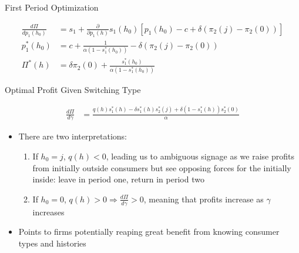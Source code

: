 \documentclass[aspectratio=169,professionalfonts]{beamer}
\begin{document}
\begin{frame}{First Period Optimization}
  \begin{tcolorbox}
    [
    boxsep=0pt,
    left=2pt, right=2pt,
    top=1pt, bottom=1pt,
    before skip=2pt, after skip=2pt
    ]
    \setlength{\abovedisplayskip}{2pt}
    \setlength{\belowdisplayskip}{2pt}
    \begin{align*}
      \frac{d\Pi}{d p_1(h_0)} &= s_1 + \frac{\partial}{\partial p_1(h)}s_1(h_0)[p_1(h_0) - c + \delta(\pi_2(j) - \pi_2(0))] \\
      p_1^*(h_0) &= c + \frac{1}{\alpha(1-s_1^*(h_0))} - \delta(\pi_2(j) - \pi_2(0)) \\
      \Pi^*(h) &= \delta\pi_2(0) + \frac{s_1^*(h_0)}{\alpha(1-s_1^*(h_0))}
    \end{align*}
  \end{tcolorbox}
\end{frame}

\begin{frame}{Optimal Profit Given Switching Type}
  \begin{tcolorbox}
    [
    boxsep=0pt,
    left=2pt, right=2pt,
    top=1pt, bottom=1pt,
    before skip=2pt, after skip=2pt
    ]
    \setlength{\abovedisplayskip}{2pt}
    \setlength{\belowdisplayskip}{2pt}
    \begin{align*}
      \frac{d\Pi}{d\gamma} &= \frac{q(h)s_1^*(h) - \delta s_1^*(h)s_2^*(j) + \delta(1-s_1^*(h))s_2^*(0)}{\alpha}
    \end{align*}
  \end{tcolorbox}
  \begin{itemize}
    \item There are two interpretations:
    \begin{enumerate}
      \item If $h_0=j$, $q(h)<0$, leading us to ambiguous signage as we raise profits from initially outside consumers but see opposing forces for the initially inside: leave in period one, return in period two 
      \item If $h_0=0$, $q(h)>0\Rightarrow \frac{d\Pi}{d\gamma} > 0$, meaning that profits increase as $\gamma$ increases
    \end{enumerate}
    \item Points to firms potentially reaping great benefit from knowing consumer types and histories
  \end{itemize}
\end{frame}
\end{document}
